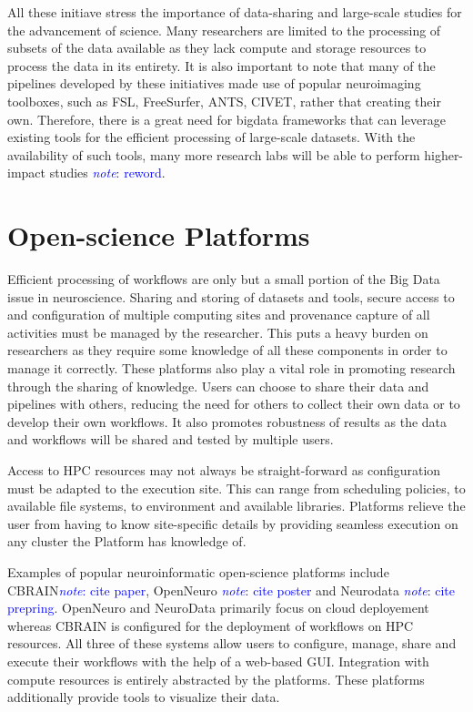\documentclass{report}
\newcommand{\note}[1]{\textcolor{blue}{\textit{note}: #1}}
\begin{document}
            All these initiave stress the importance of data-sharing and
            large-scale studies for the advancement of science. Many researchers
            are limited to the processing of subsets of the data available as 
            they lack compute and storage resources to process the data in its
            entirety. It is also important to note that many of the pipelines 
            developed by these initiatives made use of popular neuroimaging 
            toolboxes, such as FSL, FreeSurfer, ANTS, CIVET, rather that
            creating their own. Therefore, there is a great need for bigdata
            frameworks that can leverage existing tools for the efficient 
            processing of large-scale datasets. With the availability of such 
            tools, many more research labs will be able to perform
            higher-impact studies \note{reword}.


        \section{Open-science Platforms}\label{platforms}
            Efficient processing of workflows are only but a small portion of 
            the Big Data issue in neuroscience. Sharing and storing of datasets
            and tools, secure access to and configuration of multiple computing 
            sites and provenance capture of all activities must be managed by 
            the researcher. This puts a heavy burden on researchers as they 
            require some knowledge of all these components in order to manage it
            correctly. These platforms also play a vital role in promoting 
            research through the sharing of knowledge. Users can choose to share
            their data and pipelines with others, reducing the need for others 
            to collect their own data or to develop their own workflows. It 
            also promotes robustness of results as the data and workflows will 
            be shared and tested by multiple users.

            Access to HPC resources may not always be straight-forward as 
            configuration must be adapted to the execution site. This can 
            range from scheduling policies, to available file systems, to 
            environment and available libraries. Platforms relieve the user
            from having to know site-specific details by providing seamless
            execution on any cluster the Platform has knowledge of.

            Examples of popular neuroinformatic open-science platforms include 
            CBRAIN\note{cite paper}, OpenNeuro \note{cite poster} and Neurodata
            \note{cite prepring}. OpenNeuro and NeuroData primarily focus on
            cloud deployement whereas CBRAIN is configured for the deployment
            of workflows on HPC resources. All three of these systems allow 
            users to configure, manage, share and execute their workflows with 
            the help of a web-based GUI. Integration with compute resources is
            entirely abstracted by the platforms. These platforms additionally
            provide tools to visualize their data.
\end{document}

